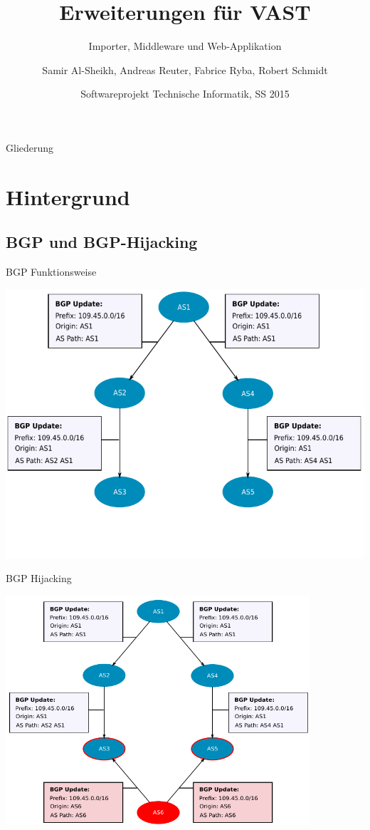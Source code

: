\documentclass[9pt]{beamer}
\title{Erweiterungen für VAST}
\subtitle{Importer, Middleware und Web-Applikation}
\author{Samir Al-Sheikh, Andreas Reuter, Fabrice Ryba, Robert Schmidt}
\institute[FU Berlin]{Freie Universität Berlin}
\date[]{Softwareprojekt Technische Informatik, SS 2015}
\begin{document}
\begin{frame}
    \titlepage
\end{frame}

\begin{frame}{Gliederung}
  \tableofcontents
\end{frame}


\section{Hintergrund}

\subsection{BGP und BGP-Hijacking}

\begin{frame}{BGP Funktionsweise}{}
	\begin{center}
		\includegraphics[width=1.0\textwidth]{res/bgp_propagation.pdf}
	\end{center}
\end{frame}

\begin{frame}{BGP Hijacking}{}
	\begin{center}
		\includegraphics[width=0.85\textwidth]{res/prefix_hijack.pdf}
	\end{center}
\end{frame}
\end{document}
